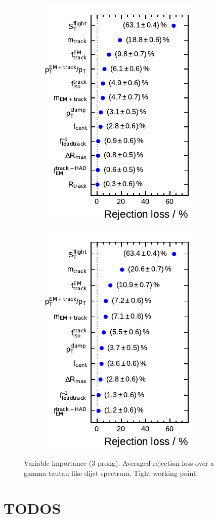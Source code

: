 \begin{figure}[ht]
  \begin{subfigure}[t]{0.33\textwidth}
    \centering
    \includegraphics{./figures/bdt_perf/var_importance/3p_iter1.pdf}
  \end{subfigure}
  \begin{subfigure}[t]{0.33\textwidth}
    \centering
    \includegraphics{./figures/bdt_perf/var_importance/3p_iter2.pdf}
  \end{subfigure}
  \begin{subfigure}[t]{0.33\textwidth}
    \centering
  \end{subfigure}

  \caption{Variable importance (3-prong). Averaged rejection loss over a
    gamma-tautau like dijet spectrum. Tight working point.}
  \label{fig:variable_importance_3p_app}
\end{figure}

\section{TODOS}
\listoftodos


